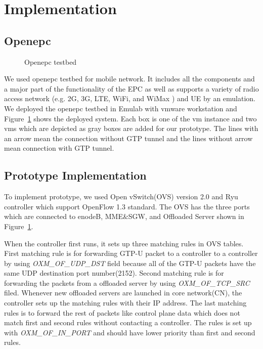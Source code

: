 \section{Implementation}

\subsection{Openepc}

\begin{figure}
\centering
{} %
\caption{Openepc testbed}
\label{fig:testbed}
\end{figure}

We used openepc testbed for mobile network. It includes all the components and a major part of the functionality of the EPC as well as supports a variety of radio access network (e.g. 2G, 3G, LTE, WiFi, and WiMax )  and UE by an emulation. We deployed the openepc testbed in Emulab with vmware workstation and Figure~\ref{fig:testbed} shows the deployed system. 
Each box is one of the vm instance and two vms which are depicted as gray boxes are added for our prototype. The lines with an arrow mean the connection without GTP tunnel and the lines without arrow mean connection with GTP tunnel.


\subsection{Prototype Implementation}

To implement prototype, we used Open vSwitch(OVS) version 2.0 and Ryu controller which support OpenFlow 1.3 standard. The OVS has the three ports which are connected to enodeB, MME\&SGW, and Offloaded Server shown in Figure~\ref{fig:testbed}. 

When the controller first runs, it sets up three matching rules in OVS tables. 
First matching rule is for forwarding GTP-U packet to a controller to a controller by using \textit{OXM\_OF\_UDP\_DST} field because all of the GTP-U packets have the same UDP destination port number(2152).  Second matching rule is for forwarding the packets from a offloaded server by using \textit{OXM\_OF\_TCP\_SRC} filed. Whenever new offloaded servers are launched in core network(CN), the controller sets up the matching rules with their IP address. 
The last matching rules is to forward the rest of packets like control plane data which does not match first and second rules without contacting a controller. The rules is set up with \textit{OXM\_OF\_IN\_PORT} and should have lower priority than first and second rules. 

